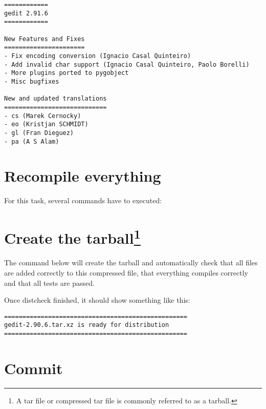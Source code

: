 \noindent{}

\begin{lstlisting}[style=plain]
============
gedit 2.91.6
============

New Features and Fixes
======================
- Fix encoding conversion (Ignacio Casal Quinteiro)
- Add invalid char support (Ignacio Casal Quinteiro, Paolo Borelli)
- More plugins ported to pygobject
- Misc bugfixes

New and updated translations
============================
- cs (Marek Cernocky)
- eo (Kristjan SCHMIDT)
- gl (Fran Dieguez)
- pa (A S Alam)
\end{lstlisting}

\section*{Recompile everything}

For this task, several commands have to executed:

\noindent{}

\noindent{}

\noindent{}

\newpage
\section*{Create the tarball\footnote{A tar file or compressed tar file is commonly referred to as a tarball.}}

The command below will create the tarball and automatically check that all files are added correctly to this compressed file, that everything compiles correctly and that all tests are passed.

\noindent{}

Once distcheck finished, it should show something like this:

\begin{lstlisting}[style=plain]
==================================================
gedit-2.90.6.tar.xz is ready for distribution
==================================================
\end{lstlisting}

\section*{Commit}

\noindent{}

